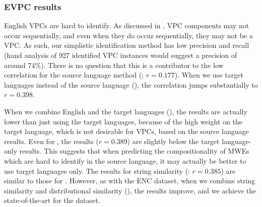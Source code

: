 \documentclass[output=paper
,modfonts
,nonflat]{langsci/langscibook}
\begin{document}


\subsubsection{EVPC results}

English VPCs are hard to identify. As discussed in , VPC
components may not occur sequentially, and even when they do occur
sequentially, they may not be a VPC. As such, our simplistic
identification method has low precision and recall (hand analysis of 927
identified VPC instances would suggest a precision of around 74\%). There is no
question that this is a contributor to the low correlation for the
source language method (\CSsource; $r = 0.177$). When we use target
languages instead of the source language (\CStarg), the correlation
jumps substantially to $r = 0.398$.

When we combine English and the target languages (\CSsourcetarg), the
results are actually lower than just using the target languages, because
of the high weight on the target language, which is not desirable for
VPCs, based on the source language results. Even for \CSsvr, the results
($r = 0.389$) are slightly below the target language-only results. This
suggests that when predicting the compositionality of MWEs which are
hard to identify in the source language, it may actually be better to
use target languages only. The results for string similarity (\CSstring:
$r = 0.385$) are similar to those for \CStarg. However, as with the ENC
dataset, when we combine string similarity and distributional similarity
(\CSall), the results improve, and we achieve the state-of-the-art for
the dataset.
\end{document}
